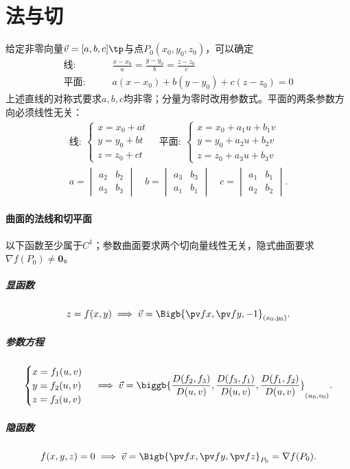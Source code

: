 \section{法与切}
给定非零向量$\vec v=[a,b,c]\tp$与点$P_0(x_0,y_0,z_0)$，可以确定
\begin{align*}
	\text{线}:   & \qquad \frac{x-x_0}a=\frac{y-y_0}b=\frac{z-z_0}c \\
	\text{平面}: & \qquad a(x-x_0)+b(y-y_0)+c(z-z_0)=0
\end{align*}
上述直线的对称式要求$a,b,c$均非零；分量为零时改用参数式。平面的两条参数方向必须线性无关：
\begin{gather*}
	\text{线}:~
	\begin{cases}
		x=x_0+at \\[-1ex]
		y=y_0+bt \\[-1ex]
		z=z_0+ct
	\end{cases}
	\quad
	\text{平面}:~
	\begin{cases}
		x=x_0+a_1u+b_1v \\[-1ex]
		y=y_0+a_2u+b_2v \\[-1ex]
		z=z_0+a_3u+b_3v
	\end{cases}
	\\
	a=
	\begin{vmatrix}
		a_2 & b_2 \\
		a_3 & b_3
	\end{vmatrix}\quad b=
	\begin{vmatrix}
		a_3 & b_3 \\
		a_1 & b_1
	\end{vmatrix}\quad c=
	\begin{vmatrix}
		a_1 & b_1 \\
		a_2 & b_2
	\end{vmatrix}.
\end{gather*}
\paragraph{曲面的法线和切平面}
以下函数至少属于$C^1$；参数曲面要求两个切向量线性无关，隐式曲面要求$\nabla f(P_0)\neq\bm0$。
\subparagraph{显函数}
\[
	z=f(x,y)\implies\vec v=\Bigb{\pv fx,\pv fy,-1}_{(x_0,y_0)}.
\]
\subparagraph{参数方程}
\begin{align*}
	\begin{cases}
		x=f_1(u,v) \\
		y=f_2(u,v) \\
		z=f_3(u,v)
	\end{cases}
	\implies\vec v=\biggb{\frac{D(f_2,f_3)}{D(u,v)},\frac{D(f_3,f_1)}{D(u,v)},\frac{D(f_1,f_2)}{D(u,v)}}_{(u_0,v_0)}.
\end{align*}
\subparagraph{隐函数}
\[
	f(x,y,z)=0\implies\vec v=\Bigb{\pv fx,\pv fy,\pv fz}_{P_0}=\nabla f(P_0).
\]
